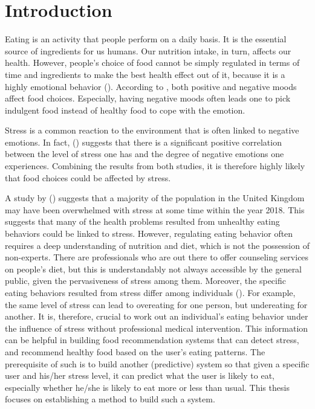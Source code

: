 
\chapter{Introduction}\label{chapter:introduction}
Eating is an activity that people perform on a daily basis. It is the essential source of ingredients for us humans. Our nutrition intake, in turn, affects our health. However, people’s choice of food cannot be simply regulated in terms of time and ingredients to make the best health effect out of it, because it is a highly emotional behavior (\cite{4_mood_eat, 14_comfort_food}). According to \citeauthor{4_mood_eat}, both positive and negative moods affect food choices. Especially, having negative moods often leads one to pick indulgent food instead of healthy food to cope with the emotion.

Stress is a common reaction to the environment that is often linked to negative emotions. In fact, \citeauthor{1_stress_emotion} (\citeyear{1_stress_emotion}) suggests that there is a significant positive correlation between the level of stress one has and the degree of negative emotions one experiences. Combining the results from both studies, it is therefore highly likely that food choices could be affected by stress.

A study by \citeauthor{2_many_stress} (\citeyear{2_many_stress}) suggests that a majority of the population in the United Kingdom may have been overwhelmed with stress at some time within the year 2018. This suggests that many of the health problems resulted from unhealthy eating behaviors could be linked to stress. However, regulating eating behavior often requires a deep understanding of nutrition and diet, which is not the possession of non-experts. There are professionals who are out there to offer counseling services on people’s diet, but this is understandably not always accessible by the general public, given the pervasiveness of stress among them. Moreover, the specific eating behaviors resulted from stress differ among individuals (\cite{5_stress_eating}). For example, the same level of stress can lead to overeating for one person, but undereating for another. It is, therefore, crucial to work out an individual’s eating behavior under the influence of stress without professional medical intervention. This information can be helpful in building food recommendation systems that can detect stress, and recommend healthy food based on the user’s eating patterns. The prerequisite of such is to build another (predictive) system so that given a specific user and his/her stress level, it can predict what the user is likely to eat, especially whether he/she is likely to eat more or less than usual. This thesis focuses on establishing a method to build such a system. \bigskip

